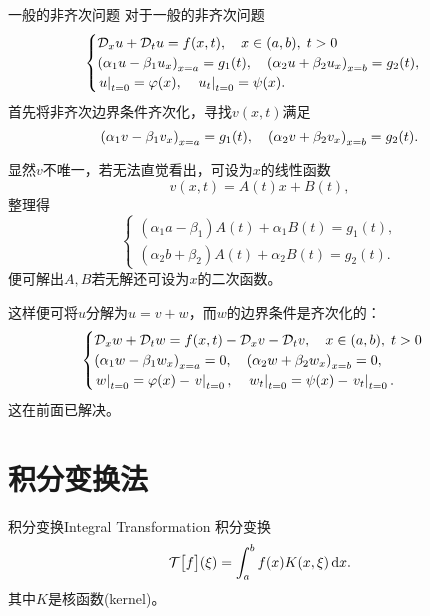 \begin{method}{一般的非齐次问题}{}
	对于一般的非齐次问题
	\begin{align*}
		\begin{cases}
			\mathcal D_xu+\mathcal D_tu=f(x,t),\quad x\in(a,b),\;t>0\\
			\left(\alpha_1u-\beta_1u_x\right)_{x=a}=g_1(t),\quad\left(\alpha_2u+\beta_2u_x\right)_{x=b}=g_2(t),\\
			\left.u\right\rvert_{t=0}=\varphi(x),\quad\left.u_t\right\rvert_{t=0}=\psi(x).
		\end{cases}
	\end{align*}
	首先将非齐次边界条件齐次化，寻找$v(x,t)$满足 
	\[
		\left(\alpha_1v-\beta_1v_x\right)_{x=a}=g_1(t),\quad\left(\alpha_2v+\beta_2v_x\right)_{x=b}=g_2(t).
	\]
	
	显然$v$不唯一，若无法直觉看出，可设为$x$的线性函数
	\[
		v(x,t)=A(t)x+B(t),
	\]
	整理得
	\[
		\begin{cases}
			(\alpha_1a-\beta_1)A(t)+\alpha_1B(t)=g_1(t),\\
			(\alpha_2b+\beta_2)A(t)+\alpha_2B(t)=g_2(t).
		\end{cases}
	\]
	便可解出$A,B$若无解还可设为$x$的二次函数。
	
	这样便可将$u$分解为$u=v+w$，而$w$的边界条件是齐次化的：
	\begin{align*}
		\begin{cases}
			\mathcal D_xw+\mathcal D_tw=f(x,t)-\mathcal D_xv-\mathcal D_tv,\quad x\in(a,b),\;t>0\\
			\left(\alpha_1w-\beta_1w_x\right)_{x=a}=0,\quad\left(\alpha_2w+\beta_2w_x\right)_{x=b}=0,\\
			\left.w\right\rvert_{t=0}=\varphi(x)-\left.v\right\rvert_{t=0},\quad\left.w_t\right\rvert_{t=0}=\psi(x)-\left.v_t\right\rvert_{t=0}.
		\end{cases}
	\end{align*}
	这在前面已解决。
\end{method}
\clearpage
\section{积分变换法}
\begin{definition}{积分变换}{Integral Transformation}
	积分变换
	\[
		\mathcal T\bigl[f\bigr](\xi)=\int_a^bf(x)K(x,\xi)\mathop{}\!\mathrm{d} x.
	\]
	其中$K$是核函数(kernel)。
\end{definition}
